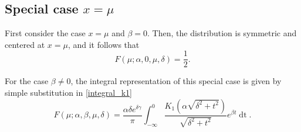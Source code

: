 \documentclass[10pt,a4paper,oneside]{article}
\numberwithin{equation}{section}
\begin{document}
\subsection{Special case $x = \mu$}
First consider the case $x = \mu$ and $\beta = 0$. Then, the distribution is symmetric and centered at $x = \mu$, and it follows that
\begin{equation}
F(\mu; \alpha, 0, \mu, \delta) = \frac{1}{2}.
\end{equation}

For the case $\beta \neq 0$, the integral representation of this special case is given by simple substitution in \eqref{integral_k1}
\begin{equation}\label{integral_k1_x=mu}
F(\mu; \alpha, \beta, \mu, \delta) = \frac{\alpha \delta e^{\delta \gamma}}{\pi} \int_{-\infty}^{0} \frac{K_1\left(\alpha\sqrt{\delta^2 + t^2}\right)}{\sqrt{\delta^2 + t^2}} e^{\beta t} \mathop{dt}.
\end{equation}
\end{document}

